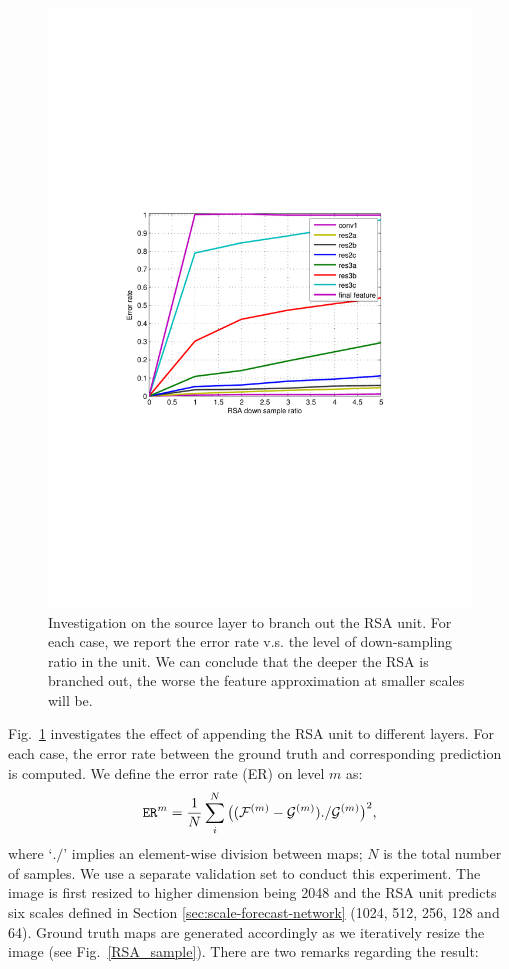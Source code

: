 \documentclass[10pt,twocolumn,letterpaper]{article}
\begin{document}
\begin{figure}[t]
\begin{center}
   \includegraphics[width=.8\linewidth]{featurelevel.pdf}
\end{center}
\vspace{-.4cm}
\caption{Investigation on the source layer to branch out the RSA unit. 
For each case, we report the error rate v.s. the level of down-sampling ratio in the unit.
%
We can conclude that the deeper the RSA is branched out, the worse the feature approximation at smaller scales will be.
}
\label{featlevel}
\end{figure}

Fig.~\ref{featlevel} investigates the effect of appending the RSA unit to different layers. For each case, the error
rate between the ground truth and corresponding prediction is computed. We define the error rate (ER) on level $m$ as:
\begin{equation}
\texttt{ER}^m = \frac{1}{N} \sum_{i}^{N} \big(  (    \mathcal{F}^{(m)} - \mathcal{G}^{(m)}  ) ./ \mathcal{G}^{(m)} \big)^2,
\vspace{-.2cm}
\end{equation}
where `$./$' implies an element-wise division between maps; $N$ is the total number of samples. 
%
We use a separate validation set to conduct this experiment. 
The image is first resized to higher dimension being 2048 and the RSA unit predicts six scales defined in Section \ref{sec:scale-forecast-network} (1024, 512, 256, 128 and 64).
%
Ground truth maps are generated accordingly as we iteratively resize the image (see Fig.~\ref{RSA_sample}).
%
There are two remarks regarding the result:
\end{document}
